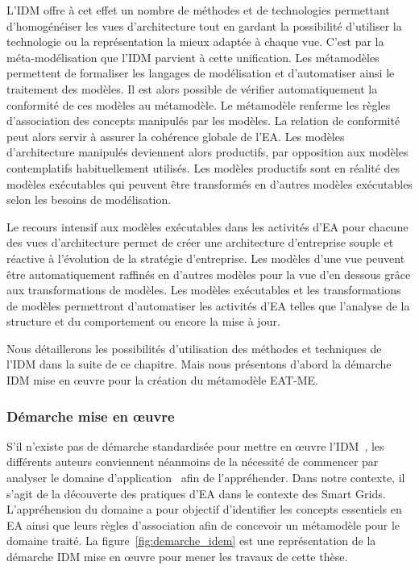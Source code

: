     L'IDM offre à cet effet un nombre de méthodes et de technologies permettant d’homogénéiser
    les vues d'architecture tout en gardant la possibilité d'utiliser la technologie ou la représentation
    la mieux adaptée à chaque vue.
    C'est par la méta-modélisation que l'IDM parvient à cette unification. Les métamodèles
    permettent de formaliser les langages de modélisation  et d'automatiser ainsi
    le traitement des modèles.
    Il est alors possible de vérifier automatiquement la conformité de ces modèles au métamodèle.
    Le métamodèle renferme les règles d'association des concepts manipulés par les modèles.
    La relation de conformité peut alors servir à assurer la cohérence globale de l'EA.
    Les modèles d'architecture manipulés deviennent alors productifs,
    par opposition aux modèles contemplatifs habituellement utilisés. Les modèles productifs sont
    en réalité des modèles exécutables qui peuvent être transformés en d'autres modèles exécutables
    selon les besoins de modélisation.

    Le recours intensif aux modèles exécutables dans les activités d'EA
    pour chacune des vues d'architecture permet de créer une architecture d'entreprise
    souple et réactive à l'évolution de la stratégie d'entreprise. Les modèles d'une vue peuvent être automatiquement
    raffinés en d'autres modèles pour la vue d'en dessous grâce aux transformations de modèles. Les modèles
    exécutables et les transformations de modèles permettront d'automatiser
    les activités d'EA telles que l'analyse de la structure et du comportement
    ou encore la mise à jour.


    Nous détaillerons les possibilités d'utilisation des méthodes et techniques de l'IDM
    dans la suite de ce chapitre. Mais nous présentons d'abord la démarche IDM mise en
    œuvre pour la création du métamodèle EAT-ME.

    \subsubsection{Démarche mise en œuvre}

    S'il n'existe pas de démarche standardisée pour mettre en œuvre
    l'IDM~\cite{barbier13phd}, les différents auteurs conviennent néanmoins de la
    nécessité  de commencer par analyser le domaine d'application~\cite{jezequel2012ingenierie} afin
    de l'appréhender.
    Dans notre contexte, il s'agit de la découverte des pratiques
    d'EA dans le contexte des Smart Grids. L’appréhension du domaine a
    pour objectif d'identifier les concepts essentiels en EA ainsi que leurs
    règles d'association afin de concevoir un métamodèle pour le domaine traité. La
    figure~\ref{fig:demarche_idem} est une représentation de la démarche IDM
    mise en œuvre pour mener les travaux de cette thèse.

